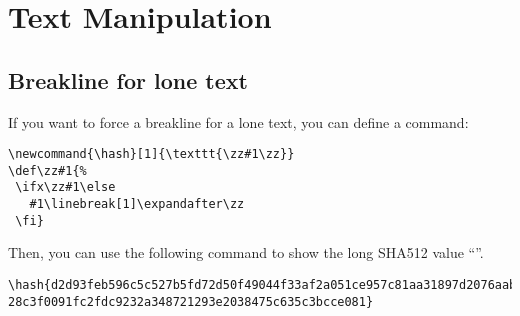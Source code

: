 \section{Text Manipulation}

\subsection{Breakline for lone text}

If you want to force a breakline for a lone text, you can define a command:

\begin{lstlisting}
\newcommand{\hash}[1]{\texttt{\zz#1\zz}}
\def\zz#1{%
 \ifx\zz#1\else
   #1\linebreak[1]\expandafter\zz
 \fi}
\end{lstlisting}

Then, you can use the following command to show the long SHA512 value ``''.

\begin{lstlisting}
\hash{d2d93feb596c5c527b5fd72d50f49044f33af2a051ce957c81aa31897d2076aab34e4edbc2e331
28c3f0091fc2fdc9232a348721293e2038475c635c3bcce081}
\end{lstlisting}
